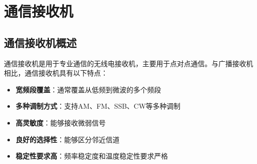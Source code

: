 
\chapter{通信接收机}
\label{chap:communication_receiver}

\section{通信接收机概述}
\label{sec:comm_receiver_intro}

通信接收机是用于专业通信的无线电接收机，主要用于点对点通信。与广播接收机相比，通信接收机具有以下特点：

\begin{itemize}
    \item \textbf{宽频段覆盖}：通常覆盖从低频到微波的多个频段
    \item \textbf{多种调制方式}：支持AM、FM、SSB、CW等多种调制
    \item \textbf{高灵敏度}：能够接收微弱信号
    \item \textbf{良好的选择性}：能够区分邻近信道
    \item \textbf{稳定性要求高}：频率稳定度和温度稳定性要求严格
\end{itemize}

